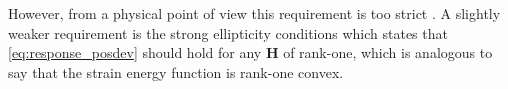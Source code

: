 However, from a physical point of view this requirement is too strict
\cite{ball1976convexity}. A slightly weaker requirement is the strong
ellipticity conditions which states that \eqref{eq:response_posdev}
should hold for any $\mathbf{H}$ of rank-one, which is analogous to
say that the strain energy function is rank-one convex. 








